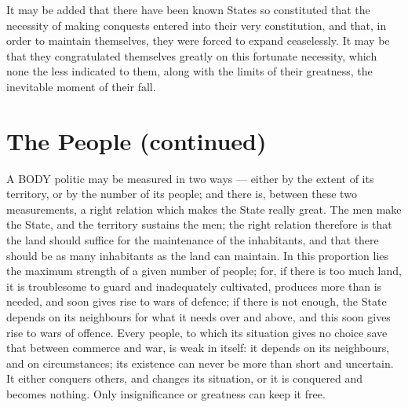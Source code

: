 \documentclass[12pt]{book}
\begin{document}
It may be added that there have been known States so constituted that the necessity of making conquests entered into their very constitution, and that, in order to maintain themselves, they were forced to expand ceaselessly. It may be that they congratulated themselves greatly on this fortunate necessity, which none the less indicated to them, along with the limits of their greatness, the inevitable moment of their fall.

\section{The People (continued)}

A BODY politic may be measured in two ways — either by the extent of its territory, or by the number of its people; and there is, between these two measurements, a right relation which makes the State really great. The men make the State, and the territory sustains the men; the right relation therefore is that the land should suffice for the maintenance of the inhabitants, and that there should be as many inhabitants as the land can maintain. In this proportion lies the maximum strength of a given number of people; for, if there is too much land, it is troublesome to guard and inadequately cultivated, produces more than is needed, and soon gives rise to wars of defence; if there is not enough, the State depends on its neighbours for what it needs over and above, and this soon gives rise to wars of offence. Every people, to which its situation gives no choice save that between commerce and war, is weak in itself: it depends on its neighbours, and on circumstances; its existence can never be more than short and uncertain. It either conquers others, and changes its situation, or it is conquered and becomes nothing. Only insignificance or greatness can keep it free.
\end{document}
